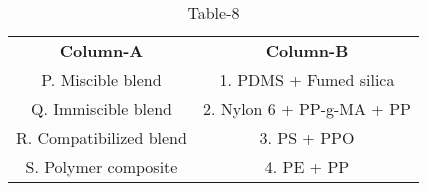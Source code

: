 \begin{table}[htbp]
  \centering
  \caption{Table-8}
  \label{table8}
  \begin{tabular}{cc}
\textbf{Column-A} & \textbf{Column-B}\\

P. Miscible blend & 1. PDMS + Fumed silica \\
Q. Immiscible blend & 2. Nylon 6 + PP-g-MA + PP \\
R. Compatibilized blend & 3. PS + PPO \\
S. Polymer composite & 4. PE + PP\\
  
  
  
  \end{tabular}
\end{table}